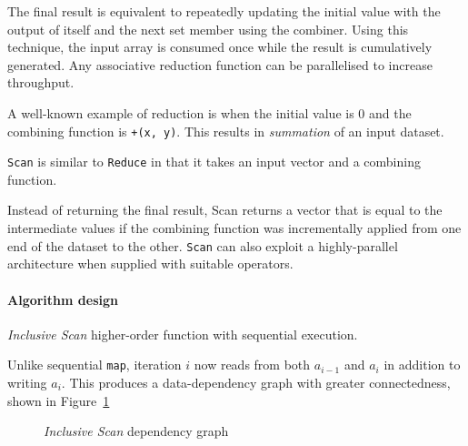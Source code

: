 The final result is equivalent to repeatedly updating the initial value with the output of itself and the next set member using the combiner. Using this technique, the input array is consumed once while the result is cumulatively generated. Any associative reduction function can be parallelised to increase throughput.

A well-known example of reduction is when the initial value is $0$ and the combining function is \verb|+(x, y)|. This results in \emph{summation} of an input dataset.

\verb|Scan| is similar to \verb|Reduce| in that it takes an input vector and a combining function.

Instead of returning the final result, Scan returns a vector that is equal to the intermediate values if the combining function was incrementally applied from one end of the dataset to the other. \verb|Scan| can also exploit a highly-parallel architecture when supplied with suitable operators.

\paragraph*{Algorithm design}
\begin{algorithm}
  \caption{\emph{Inclusive Scan} higher-order function with sequential execution.}
  \label{alg:seqscan}

  \begin{algorithmic}
      \EndFor
    \EndFunction
  \end{algorithmic}
\end{algorithm}

Unlike sequential \verb|map|, iteration $i$ now reads from both $a_{i-1}$ and $a_{i}$ in addition to writing $a_i$. This produces a data-dependency graph with greater connectedness, shown in Figure~\ref{fig:scangraph}

\begin{figure}[h]
  \caption{\emph{Inclusive Scan} dependency graph}
  \label{fig:scangraph}
  \begin{center}
  \end{center}
\end{figure}

